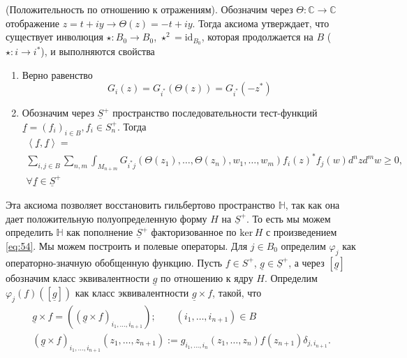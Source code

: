 \begin{axiom}
  (Положительность по отношению к отражениям).
  Обозначим через $\Theta:\mathbb{C}\to\mathbb{C}$  отображение $z=t+i y\to \Theta(z)= -t+i y$. Тогда аксиома утверждает, что существует инволюция $\star:B_{0}\to B_{0}$, $\star^{2}=\mathrm{id}_{B_{0}}$, которая продолжается на $B$ ($\star:i\to i^{*}$), и выполняются свойства
  \begin{enumerate}
  \item Верно равенство
    \begin{equation}
      \label{eq:53}
      G_{i}(z)=G_{i^{*}}(\Theta(z))=G_{i^{*}}(-z^{*})
    \end{equation}
  \item Обозначим через $\underline{S}^{+}$ пространство последовательности тест-функций $\underline{f}=(f_{i})_{i\in B}, f_{i}\in S^{+}_{n}$. Тогда
    \begin{multline}
      \label{eq:54}
      \left<\underline{f},\underline{f}\right>=\\
      \sum_{i,j\in B}\sum_{n,m}\int_{M_{n+m}}G_{i^{*} j}(\Theta(z_{1}),\dots ,\Theta(z_{n}),w_{1},\dots,w_{m}) f_{i}(z)^{*}f_{j}(w) d^{n}z d^{m}w 
      \geq 0,\\ \forall \underline{f}\in \underline{S}^{+}
    \end{multline}
  \end{enumerate}
\end{axiom}
Эта аксиома позволяет восстановить гильбертово пространство $\mathbb{H}$, так как она дает положительную полуопределенную форму $H$ на $\underline{S}^{+}$. То есть мы можем определить $\mathbb{H}$ как пополнение $\underline{S}^{+}$ факторизованное по $\mathrm{ker}\, H$ с произведением \eqref{eq:54}.
Мы можем построить и полевые операторы. Для $j\in B_{0}$ определим $\varphi_{j}$ как операторно-значную обобщенную функцию. Пусть $f\in S^{+}$, $\underline{g}\in\underline{S}^{+}$, а через $[\underline{g}]$ обозначим класс эквивалентности $\underline{g}$ по отношению к ядру $H$. Определим $\varphi_{j}(f)([\underline{g}])$ как класс эквивалентности $\underline{g}\times f$, такой, что
\begin{equation}
  \label{eq:55}
  \begin{array}{l}
    \underline{g}\times f=((\underline{g}\times f)_{i_{1},\dots,i_{n+1}});\quad\quad (i_{1},\dots,i_{n+1})\in B\\
    (\underline{g}\times f)_{i_{1},\dots,i_{n+1}}(z_{1},\dots,z_{n+1}):=g_{i_{1},\dots,i_{n}}(z_{1},\dots,z_{n})f(z_{n+1})\delta_{j,i_{n+1}}.
  \end{array}
\end{equation}

